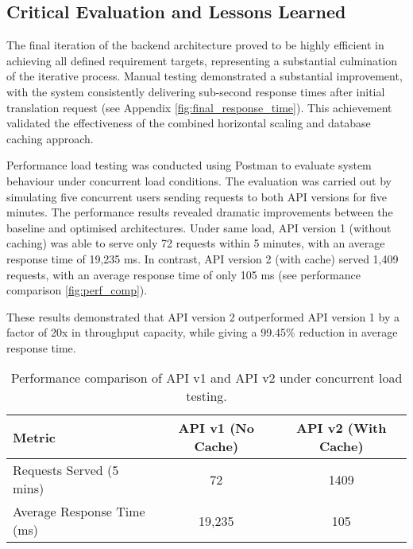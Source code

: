 \subsection{Critical Evaluation and Lessons Learned}



The final iteration of the backend architecture proved to be highly efficient in achieving all defined requirement targets, representing a substantial culmination of the iterative process. Manual testing demonstrated a substantial improvement, with the system consistently delivering sub-second response times after initial translation request (see Appendix \ref{fig:final_response_time}). This achievement validated the effectiveness of the combined horizontal scaling and database caching approach.

Performance load testing was conducted using Postman to evaluate system behaviour under concurrent load conditions. The evaluation was carried out by simulating five concurrent users sending requests to both API versions for five minutes. The performance results revealed dramatic improvements between the baseline and optimised architectures. Under same load, API version 1 (without caching) was able to serve only 72 requests within 5 minutes, with an average response time of 19,235 ms. In contrast, API version 2 (with cache) served 1,409 requests, with an average response time of only 105 ms (see performance comparison \ref{fig:perf_comp}).

These results demonstrated that API version 2 outperformed API version 1 by a factor of 20x in throughput capacity, while giving a 99.45\% reduction in average response time.

\begin{table}[h]
\centering
\begin{tabular}{|l|c|c|}
\hline
\textbf{Metric} & \textbf{API v1 (No Cache)} & \textbf{API v2 (With Cache)} \\
\hline
Requests Served (5 mins) & 72 & 1409 \\
\hline
Average Response Time (ms) & 19,235 & 105 \\
\hline
\end{tabular}
\caption{Performance comparison of API v1 and API v2 under concurrent load testing.}
\label{tab:perf_comp}
\end{table}

